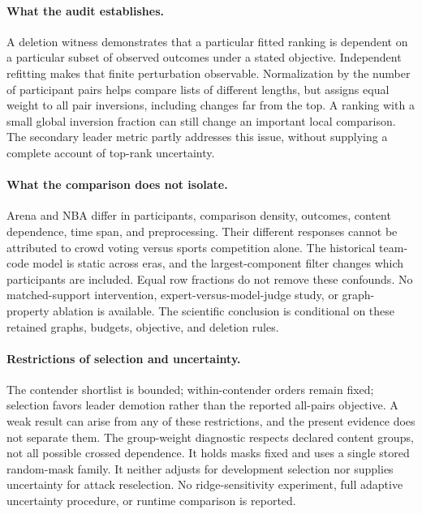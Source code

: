 \documentclass{article}
\begin{document}
\paragraph{What the audit establishes.}
A deletion witness demonstrates that a particular fitted ranking is dependent on a particular subset of observed outcomes under a stated objective. Independent refitting makes that finite perturbation observable. Normalization by the number of participant pairs helps compare lists of different lengths, but assigns equal weight to all pair inversions, including changes far from the top. A ranking with a small global inversion fraction can still change an important local comparison. The secondary leader metric partly addresses this issue, without supplying a complete account of top-rank uncertainty.

\paragraph{What the comparison does not isolate.}
Arena and NBA differ in participants, comparison density, outcomes, content dependence, time span, and preprocessing. Their different responses cannot be attributed to crowd voting versus sports competition alone. The historical team-code model is static across eras, and the largest-component filter changes which participants are included. Equal row fractions do not remove these confounds. No matched-support intervention, expert-versus-model-judge study, or graph-property ablation is available. The scientific conclusion is conditional on these retained graphs, budgets, objective, and deletion rules.

\paragraph{Restrictions of selection and uncertainty.}
The contender shortlist is bounded; within-contender orders remain fixed; selection favors leader demotion rather than the reported all-pairs objective. A weak result can arise from any of these restrictions, and the present evidence does not separate them. The group-weight diagnostic respects declared content groups, not all possible crossed dependence. It holds masks fixed and uses a single stored random-mask family. It neither adjusts for development selection nor supplies uncertainty for attack reselection. No ridge-sensitivity experiment, full adaptive uncertainty procedure, or runtime comparison is reported.
\end{document}
